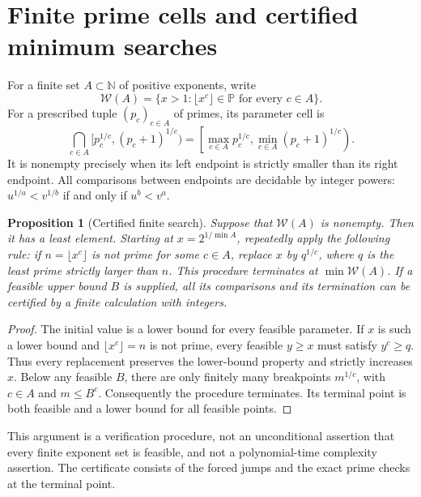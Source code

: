 \documentclass[11pt,a4paper]{article}
\newtheorem{proposition}[theorem]{Proposition}
\theoremstyle{definition}
\theoremstyle{remark}
\numberwithin{equation}{section}
\begin{document}
\section{Finite prime cells and certified minimum searches}
\label{enc:sp:finite}

For a finite set $A\subset\mathbb N$ of positive exponents, write
\[
 \mathcal W(A)=\{x>1:\lfloor x^c\rfloor\in\mathbb P\text{ for every }c\in A\}.
\]
For a prescribed tuple $(p_c)_{c\in A}$ of primes, its parameter cell is
\begin{equation}\label{enc:sp:cell}
 \bigcap_{c\in A}[p_c^{1/c},(p_c+1)^{1/c})
 =\left[\max_{c\in A}p_c^{1/c},\min_{c\in A}(p_c+1)^{1/c}\right).
\end{equation}
It is nonempty precisely when its left endpoint is strictly smaller than
its right endpoint. All comparisons between endpoints are decidable by
integer powers: $u^{1/a}<v^{1/b}$ if and only if $u^b<v^a$.

\begin{proposition}[Certified finite search]\label{enc:sp:finite-search}
Suppose that $\mathcal W(A)$ is nonempty. Then it has a least element.
Starting at $x=2^{1/\min A}$, repeatedly apply the following rule: if
$n=\lfloor x^c\rfloor$ is not prime for some $c\in A$, replace $x$ by
$q^{1/c}$, where $q$ is the least prime strictly larger than $n$.
This procedure terminates at $\min\mathcal W(A)$. If a feasible upper
bound $B$ is supplied, all its comparisons and its termination can be
certified by a finite calculation with integers.
\end{proposition}
\begin{proof}
The initial value is a lower bound for every feasible parameter. If $x$
is such a lower bound and $\lfloor x^c\rfloor=n$ is not prime, every
feasible $y\ge x$ must satisfy $y^c\ge q$. Thus every replacement preserves
the lower-bound property and strictly increases $x$. Below any feasible
$B$, there are only finitely many breakpoints $m^{1/c}$, with $c\in A$ and
$m\le B^c$. Consequently the procedure terminates. Its terminal point
is both feasible and a lower bound for all feasible points.
\end{proof}

This argument is a verification procedure, not an unconditional assertion
that every finite exponent set is feasible, and not a polynomial-time
complexity assertion. The certificate consists of the forced jumps and
the exact prime checks at the terminal point.
\end{document}
